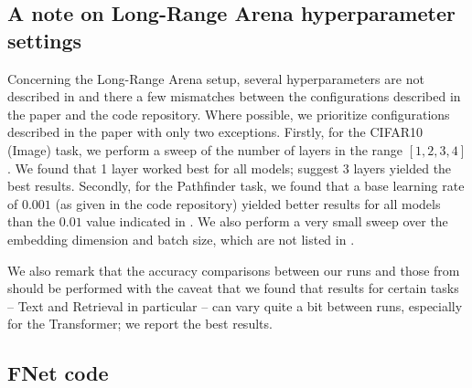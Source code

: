\documentclass[11pt]{article}
\begin{document}
\subsection{A note on Long-Range Arena hyperparameter settings}
\label{app:lra}

Concerning the Long-Range Arena setup, several hyperparameters are not described in \citet{tay2020long} and there a few mismatches between the configurations described in the paper and the code repository. Where possible, we prioritize configurations described in the paper with only two exceptions. Firstly, for the CIFAR10 (Image) task, we perform a sweep of the number of layers in the range $[1, 2, 3, 4]$. We found that 1 layer worked best for all models; \citet{tay2020long} suggest 3 layers yielded the best results. Secondly, for the Pathfinder task, we found that a base learning rate of $0.001$ (as given in the code repository) yielded better results for all models than the $0.01$ value indicated in \citet{tay2020long}.  We also perform a very small sweep over the embedding dimension and batch size, which are not listed in \citet{tay2020long}.

We also remark that the accuracy comparisons between our runs and those from \citet{tay2020long} should be performed with the caveat that we found that results for certain tasks -- Text and Retrieval in particular -- can vary quite a bit between runs, especially for the Transformer; we report the best results.


\subsection{FNet code}
\label{app:code}
\end{document}

